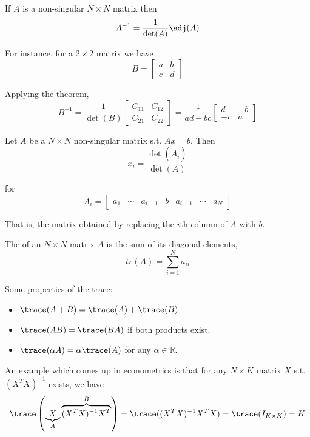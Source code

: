 \documentclass{article}
\begin{document}
\begin{theorem}
  If $A$ is a non-singular $N \times N$ matrix then
  \[
    A^{-1} = \dfrac{1}{\det(A)} \adj(A)
  \]
\end{theorem}

For instance, for a $2 \times 2$ matrix we have
\[
  B = \left[\begin{matrix}
      a & b \\ c & d
  \end{matrix}\right]
\]

Applying the theorem,
\[
  B^{-1}
  =
  \dfrac{1}{\det(B)}
  \left[\begin{matrix}
      C_{11} & C_{12} \\
      C_{21} & C_{22}
  \end{matrix}\right]
  =
  \dfrac{1}{ad - bc}
  \left[\begin{matrix}
      d & -b \\ -c & a
  \end{matrix}\right]
\]

\begin{theorem}
  Let $A$ be a $N \times N$ non-singular matrix s.t. $A x = b$. Then
  \[
    x_i = \dfrac{\det(\widetilde{A}_i)}{\det(A)}
  \]

  for
  \[
    \widetilde{A}_i = \left[\begin{matrix}
        a_1 & \cdots & a_{i - 1} & b & a_{i + 1} & \cdots & a_N
    \end{matrix}\right]
  \]

  That is, the matrix obtained by replacing the $i$th column of $A$ with $b$.
\end{theorem}

\begin{definition}
  The  of an $N \times N$ matrix $A$ is the sum of its diagonal elements,
  \[
    tr(A) = \sum^{N}_{i = 1} a_{ii}
  \]
\end{definition}

Some properties of the trace:
\begin{itemize}[label=$\bullet$]
  \item $\trace(A + B) = \trace(A) + \trace(B)$
  \item $\trace(A B) = \trace(BA)$ if both products exist.
  \item $\trace(\alpha A) = \alpha \trace(A)$ for  any $\alpha \in \mathbb{R}$.
\end{itemize}

An example which comes up in econometrics is that for any $N \times K$ matrix $X$ s.t. $\left(X^T X\right)^{-1}$ exists, we have
\[
  \trace\left(\underbrace{X}_{A} \overbrace{(X^T X)^{-1} X^T}^{B}\right)
  =
  \trace((X^T X)^{-1} X^T X)
  =
  \trace(I_{K \times K})
  =
  K
\]
\end{document}
